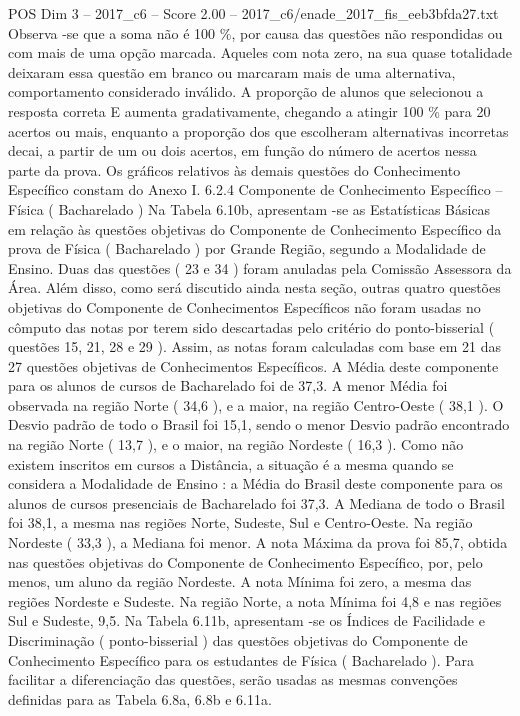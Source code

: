 \begin{textsample}{POS Dim 3 – 2017\_c6 – Score 2.00 – 2017\_c6/enade\_2017\_fis\_eeb3bfda27.txt}
Observa -se que a soma não é 100 \%, por causa das questões não respondidas ou com mais de uma opção marcada.
Aqueles com nota zero, na sua quase totalidade deixaram essa questão em branco ou marcaram mais de uma alternativa, comportamento considerado inválido.
A proporção de alunos que selecionou a resposta correta E aumenta gradativamente, chegando a atingir 100 \% para 20 acertos ou mais, enquanto a proporção dos que escolheram alternativas incorretas decai, a partir de um ou dois acertos, em função do número de acertos nessa parte da prova.
Os gráficos relativos às demais questões do Conhecimento Específico constam do Anexo I. 6.2.4 Componente de Conhecimento Específico – Física ( Bacharelado ) Na Tabela 6.10b, apresentam -se as Estatísticas Básicas em relação às questões objetivas do Componente de Conhecimento Específico da prova de Física ( Bacharelado ) por Grande Região, segundo a Modalidade de Ensino.
Duas das questões ( 23 e 34 ) foram anuladas pela Comissão Assessora da Área.
Além disso, como será discutido ainda nesta seção, outras quatro questões objetivas do Componente de Conhecimentos Específicos não foram usadas no cômputo das notas por terem sido descartadas pelo critério do ponto-bisserial ( questões 15, 21, 28 e 29 ).
Assim, as notas foram calculadas com base em 21 das 27 questões objetivas de Conhecimentos Específicos.
A Média deste componente para os alunos de cursos de Bacharelado foi de 37,3.
A menor Média foi observada na região Norte ( 34,6 ), e a maior, na região Centro-Oeste ( 38,1 ).
O Desvio padrão de todo o Brasil foi 15,1, sendo o menor Desvio padrão encontrado na região Norte ( 13,7 ), e o maior, na região Nordeste ( 16,3 ).
Como não existem inscritos em cursos a Distância, a situação é a mesma quando se considera a Modalidade de Ensino : a Média do Brasil deste componente para os alunos de cursos presenciais de Bacharelado foi 37,3.
A Mediana de todo o Brasil foi 38,1, a mesma nas regiões Norte, Sudeste, Sul e Centro-Oeste.
Na região Nordeste ( 33,3 ), a Mediana foi menor.
A nota Máxima da prova foi 85,7, obtida nas questões objetivas do Componente de Conhecimento Específico, por, pelo menos, um aluno da região Nordeste.
A nota Mínima foi zero, a mesma das regiões Nordeste e Sudeste.
Na região Norte, a nota Mínima foi 4,8 e nas regiões Sul e Sudeste, 9,5.
Na Tabela 6.11b, apresentam -se os Índices de Facilidade e Discriminação ( ponto-bisserial ) das questões objetivas do Componente de Conhecimento Específico para os estudantes de Física ( Bacharelado ).
Para facilitar a diferenciação das questões, serão usadas as mesmas convenções definidas para as Tabela 6.8a, 6.8b e 6.11a.

\end{textsample}
